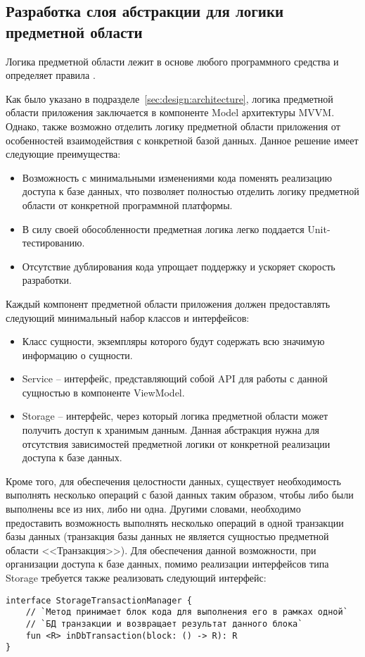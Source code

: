 \subsection{Разработка слоя абстракции для логики предметной области}
\label{sec:design:business}

Логика предметной области лежит в основе любого программного средства и определяет правила .

Как было указано в подразделе~\ref{sec:design:architecture}, логика предметной области приложения заключается в компоненте Model архитектуры MVVM\@.
Однако, также возможно отделить логику предметной области приложения от особенностей взаимодействия с конкретной базой данных.
Данное решение имеет следующие преимущества:
\begin{itemize}
    \item Возможность с минимальными изменениями кода поменять реализацию доступа к базе данных, что позволяет полностью отделить логику предметной области от конкретной программной платформы.
    \item В силу своей обособленности предметная логика легко поддается Unit-тестированию.
    \item Отсутствие дублирования кода упрощает поддержку и ускоряет скорость разработки.
\end{itemize}

Каждый компонент предметной области приложения должен предоставлять следующий минимальный набор классов и интерфейсов:
\begin{itemize}
    \item Класс сущности, экземпляры которого будут содержать всю значимую информацию о сущности.
    \item Service -- интерфейс, представляющий собой API для работы с данной сущностью в компоненте ViewModel.
    \item Storage -- интерфейс, через который логика предметной области может получить доступ к хранимым данным.
    Данная абстракция нужна для отсутствия зависимостей предметной логики от конкретной реализации доступа к базе данных.
\end{itemize}

Кроме того, для обеспечения целостности данных, существует необходимость выполнять несколько операций с базой данных таким образом, чтобы либо были выполнены все из них, либо ни одна.
Другими словами, необходимо предоставить возможность выполнять несколько операций в одной транзакции базы данных (транзакция базы данных не является сущностью предметной области <<Транзакция>>).
Для обеспечения данной возможности, при организации доступа к базе данных, помимо реализации интерфейсов типа Storage требуется также реализовать следующий интерфейс:
\begin{lstlisting}[style=standard]
interface StorageTransactionManager {
    // `Метод принимает блок кода для выполнения его в рамках одной`
    // `БД транзакции и возвращает результат данного блока`
    fun <R> inDbTransaction(block: () -> R): R
}
\end{lstlisting}

